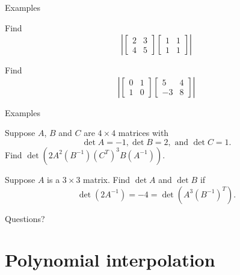\documentclass{beamer}
\begin{document}
\begin{frame}{Examples}
  \begin{example}
    Find
    \begin{equation*}
      \left|
        \left[
          \begin{array}{cc}
            2&3\\
            4&5
          \end{array}
        \right]
        \left[
          \begin{array}{cc}
            1&1\\
            1&1
          \end{array}
        \right]
      \right|
    \end{equation*}
  \end{example}
  \begin{example}
    Find
    \begin{equation*}
      \left|
        \left[
          \begin{array}{cc}
            0&1\\
            1&0
          \end{array}
        \right]
        \left[
          \begin{array}{cc}
            5&4\\
            -3&8
          \end{array}
        \right]
      \right|
    \end{equation*}
  \end{example}
\end{frame}

\begin{frame}{Examples}
  \begin{example}
    Suppose $A$, $B$ and $C$ are $4\times 4$ matrices with
    \[ \det A = -1, \det B = 2, \mbox{ and } \det C=1.\]
    Find $\det(2A^2(B^{-1})(C^T)^3 B(A^{-1}))$.
  \end{example}
  \begin{example}
    Suppose $A$ is a $3\times 3$ matrix.
    Find $\det A$ and $\det B$ if
    \[ \det(2A^{-1})=-4=\det(A^3(B^{-1})^T).\]
  \end{example}
\end{frame}

\begin{frame}
  Questions?
\end{frame}

\section{Polynomial interpolation}
\end{document}
